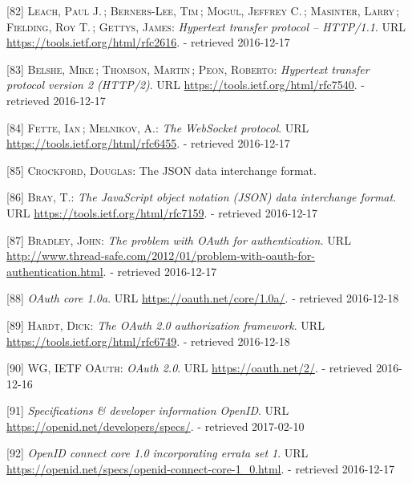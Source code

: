 \documentclass[12pt,english,a4paper,titlepage,cleardoublepage=empty,dottedtoc]{report}
\begin{document}
\hypertarget{ref-web_spec_http1}{}
{[}82{]} \textsc{Leach, Paul J.}\,; \textsc{Berners-Lee, Tim}\,;
\textsc{Mogul, Jeffrey C.}\,; \textsc{Masinter, Larry}\,;
\textsc{Fielding, Roy T.}\,; \textsc{Gettys, James}: \emph{Hypertext
transfer protocol -- HTTP/1.1}. URL
\url{https://tools.ietf.org/html/rfc2616}. - retrieved 2016-12-17

\hypertarget{ref-web_spec_http2}{}
{[}83{]} \textsc{Belshe, Mike}\,; \textsc{Thomson, Martin}\,;
\textsc{Peon, Roberto}: \emph{Hypertext transfer protocol version 2
(HTTP/2)}. URL \url{https://tools.ietf.org/html/rfc7540}. - retrieved
2016-12-17

\hypertarget{ref-web_spec_websockets}{}
{[}84{]} \textsc{Fette, Ian}\,; \textsc{Melnikov, A.}: \emph{The
WebSocket protocol}. URL \url{https://tools.ietf.org/html/rfc6455}. -
retrieved 2016-12-17

\hypertarget{ref-web_spec_json}{}
{[}85{]} \textsc{Crockford, Douglas}: The JSON data interchange format.

\hypertarget{ref-web_rfc_json}{}
{[}86{]} \textsc{Bray, T.}: \emph{The JavaScript object notation (JSON)
data interchange format}. URL \url{https://tools.ietf.org/html/rfc7159}.
- retrieved 2016-12-17

\hypertarget{ref-web_2012_problem-with-oauth-for-authentication}{}
{[}87{]} \textsc{Bradley, John}: \emph{The problem with OAuth for
authentication.} URL
\url{http://www.thread-safe.com/2012/01/problem-with-oauth-for-authentication.html}.
- retrieved 2016-12-17

\hypertarget{ref-web_spec_oauth-1a}{}
{[}88{]} \emph{OAuth core 1.0a}. URL \url{https://oauth.net/core/1.0a/}.
- retrieved 2016-12-18

\hypertarget{ref-web_spec_oauth-2}{}
{[}89{]} \textsc{Hardt, Dick}: \emph{The OAuth 2.0 authorization
framework}. URL \url{https://tools.ietf.org/html/rfc6749}. - retrieved
2016-12-18

\hypertarget{ref-web_2016_oauth-2}{}
{[}90{]} \textsc{WG, IETF OAuth}: \emph{OAuth 2.0}. URL
\url{https://oauth.net/2/}. - retrieved 2016-12-16

\hypertarget{ref-web_spec_openid-spec-index}{}
{[}91{]} \emph{Specifications \& developer information OpenID}. URL
\url{https://openid.net/developers/specs/}. - retrieved 2017-02-10

\hypertarget{ref-web_spec_openid-connect-1}{}
{[}92{]} \emph{OpenID connect core 1.0 incorporating errata set 1}. URL
\url{https://openid.net/specs/openid-connect-core-1_0.html}. - retrieved
2016-12-17
\end{document}
